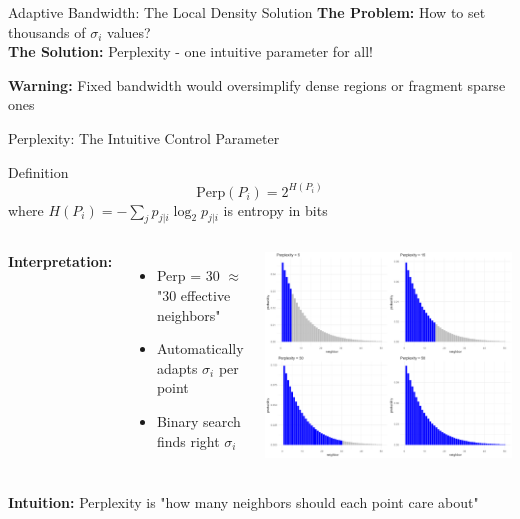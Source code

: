 \documentclass[aspectratio=169]{beamer}
\newcommand{\warning}[1]{\colorbox{red!10}{\textcolor{warningcolor}{\textbf{Warning:} #1}}}
\newcommand{\intuition}[1]{\colorbox{green!10}{\textcolor{intuitioncolor}{\textbf{Intuition:} #1}}}
\begin{document}
\begin{frame}{Adaptive Bandwidth: The Local Density Solution}
\vspace{0.3cm}
\textbf{The Problem:} How to set thousands of $\sigma_i$ values?\\
\textbf{The Solution:} Perplexity - one intuitive parameter for all!

\warning{Fixed bandwidth would oversimplify dense regions or fragment sparse ones}
\end{frame}

\begin{frame}{Perplexity: The Intuitive Control Parameter}
\begin{block}{Definition}
$$\text{Perp}(P_i) = 2^{H(P_i)}$$
where $H(P_i) = -\sum_j p_{j|i}\log_2 p_{j|i}$ is entropy in bits
\end{block}

\begin{columns}
\textbf{Interpretation:}
\begin{itemize}
\item Perp = 30 $\approx$ "30 effective neighbors"
\item Automatically adapts $\sigma_i$ per point
\item Binary search finds right $\sigma_i$
\end{itemize}

\includegraphics[width=\textwidth]{./Figures/perplexity_visual.png}
\end{columns}

\intuition{Perplexity is "how many neighbors should each point care about"}
\end{frame}
\end{document}
